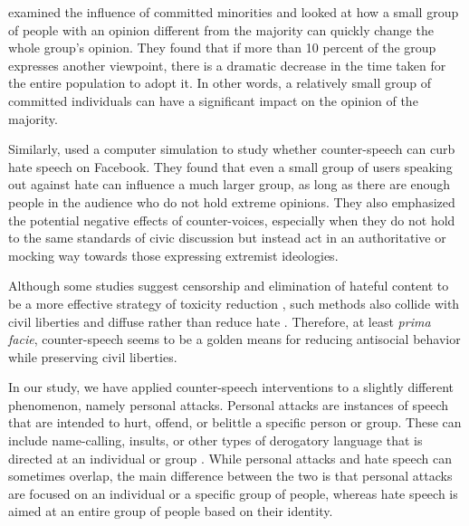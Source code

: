 \documentclass[preprint,12pt]{elsarticle}
\begin{document}
\citet{xie2011social} examined the influence of committed minorities and looked at how a small group of people with an opinion different from the majority can quickly change the whole group's opinion. They found that if more than 10 percent of the group expresses another viewpoint, there is a dramatic decrease in the time taken for the entire population to adopt it. In other words, a relatively small group of committed individuals can have a significant impact on the opinion of the majority. 

Similarly, \citet{schieb2016governing} used a computer simulation to study whether counter-speech can curb hate speech on Facebook. They found that even a small group of users speaking out against hate can influence a much larger group, as long as there are enough people in the audience who do not hold extreme opinions. They also emphasized the potential negative effects of counter-voices, especially when they do not hold to the same standards of civic discussion but instead act in an authoritative or mocking way towards those expressing extremist ideologies. 

Although some studies suggest censorship and elimination of hateful content to be a more effective strategy of toxicity reduction \citep{alvarez2018normative}, such methods also collide with civil liberties and diffuse rather than reduce hate \citep{chandrasekharan2017you}. Therefore, at least \emph{prima facie}, counter-speech seems to be a golden means for reducing antisocial behavior while preserving civil liberties.


In our study, we have applied counter-speech interventions to a slightly different phenomenon, namely personal attacks. Personal attacks are instances of speech that are intended to hurt, offend, or belittle a specific person or group. These can include name-calling, insults, or other types of derogatory language that is directed at an individual or group \citep{bilewicz2021artificial}. While personal attacks and hate speech can sometimes overlap, the main difference between the two is that personal attacks are focused on an individual or a specific group of people, whereas hate speech is aimed at an entire group of people based on their identity.
\end{document}
